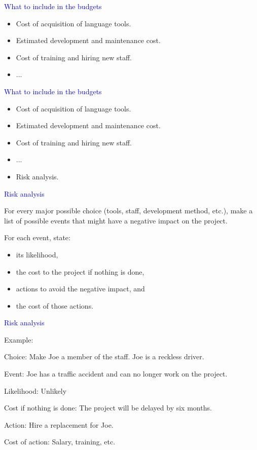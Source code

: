 \documentclass{slides}
\newcommand{\ti}[1]{\begin{center}\Large{\textcolor{blue}{#1}}\end{center}}
\begin{document}
\begin{slide}\ti{What to include in the budgets}

  \begin{itemize}
  \item Cost of acquisition of language tools.
  \item Estimated development and maintenance cost.
  \item Cost of training and hiring new staff.
  \item ...
  \end{itemize}

\vfill\end{slide}
\begin{slide}\ti{What to include in the budgets}

  \begin{itemize}
  \item Cost of acquisition of language tools.
  \item Estimated development and maintenance cost.
  \item Cost of training and hiring new staff.
  \item ...
  \item Risk analysis.
  \end{itemize}

\vfill\end{slide}
\begin{slide}\ti{Risk analysis}

For every major possible choice (tools, staff, development method,
etc.), make a list of possible events that might have a negative
impact on the project.

For each event, state:

\begin{itemize}
\item its likelihood,
\item the cost to the project if nothing is done,
\item actions to avoid the negative impact, and
\item the cost of those actions.
\end{itemize}

\vfill\end{slide}
\begin{slide}\ti{Risk analysis}

Example:

Choice: Make Joe a member of the staff.  Joe is a reckless driver.

Event: Joe has a traffic accident and can no longer work on the
project.

Likelihood: Unlikely

Cost if nothing is done: The project will be delayed by six months.

Action: Hire a replacement for Joe.

Cost of action: Salary, training, etc.

\vfill\end{slide}
\end{document}
